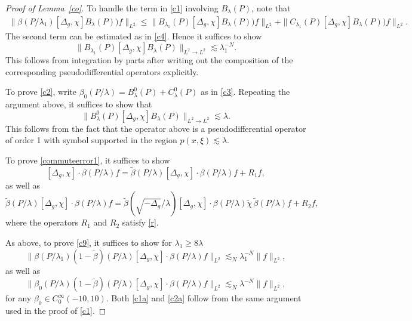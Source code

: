 \documentclass[10pt,a4paper]{amsart}
\newcommand{\la}{\lambda}
\begin{document}
\begin{proof}[Proof of Lemma~\ref{co}]
   To handle the term in \eqref{c1} involving $B_{\la}(P)$, note that
\begin{equation*}
\begin{split}
     \| \beta(P/\lambda_1)[\Delta_g, \chi]  B_{\la}(P)) f\|_{L^2}
\leq 
         \| B_{\la_1}(P)[\Delta_g, \chi]  B_{\la}(P)) f\|_{L^2}  +    \|C_{\la_1}(P)[\Delta_g, \chi]  B_{\la}(P)) f\|_{L^2}. 
\end{split}
\end{equation*}
The second term can be estimated as in \eqref{c4}.
Hence it suffices to show
\begin{equation}\label{c7}
    \|B_{\la_1}(P)[\Delta_g, \chi] B_{\la}(P)\|_{L^2\to L^2}\lesssim \la_1^{-N}.
\end{equation}
This follows from integration by parts after writing out the composition of the corresponding pseudodifferential operators explicitly.

To prove \eqref{c2},  write $  \beta_0( P/\la)
     = B^0_\la(P)+C^0_\la(P)$ as in \eqref{c3}. Repeating the argument above, it suffices to show that
\begin{equation}\label{c8}
    \|B^0_{\la}(P)[\Delta_g, \chi] B_{\la}(P)\|_{L^2\to L^2}\lesssim \la.
\end{equation}
This follows from the fact that the operator above is a pseudodifferential operator of order 1 with symbol supported in the region $p(x,\xi)\lesssim\la$.

To prove \eqref{commuteerror1}, it suffices to show 
\begin{equation}\label{c9}
    [\Delta_g,\chi] \cdot \beta(P/\la)f= \tilde\beta(P/\la)  [\Delta_g,\chi] \cdot \beta(P/\la)f
+R_1f,
\end{equation}
as well as 
\begin{equation}\label{c10}
   \tilde\beta(P/\la)  [\Delta_g,\chi] \cdot \beta(P/\la)f
   = \tilde\beta(\sqrt{-\Delta_g}/\la)  [\Delta_g,\chi] \cdot \beta(P/\la)\tilde\chi \,\tilde\beta(P/\la) f
+R_2f,
\end{equation}
where the operators $R_1$ and $R_2$ satisfy \eqref{r}.

As above, to prove \eqref{c9}, it suffices to show for $\la_1\ge 8\la$
\begin{equation}\label{c1a}
\| \beta(P/\la_1)(1-\tilde\beta)(P/\la)[\Delta_g,\chi] \cdot \beta(P/\la)f\|_{L^2}\lesssim_N \la_1^{-N}\|f\|_{L^2}, 
\end{equation}
as well as 
\begin{equation}\label{c2a}
\| \beta_0(P/\la)(1-\tilde\beta)(P/\la)[\Delta_g,\chi] \cdot \beta(P/\la)f\|_{L^2}\lesssim_N \la^{-N}\|f\|_{L^2},
\end{equation}
for any $\beta_0\in C_0^\infty(-10,10)$. 
Both \eqref{c1a} and \eqref{c2a} follow from the same argument used in the proof of \eqref{c1}.


\end{proof}
\end{document}
